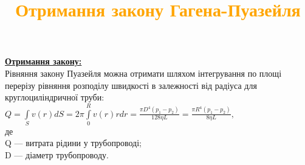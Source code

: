 \documentclass[aspectratio=169]{beamer}
\begin{document}
{
\title{\textcolor{orange}{Отримання закону Гагена-Пуазейля}}
\begin{frame}
\textbf{\underline{Отримання закону:}}\\
Рівняння закону Пуазейля можна отримати шляхом інтегрування по площі перерізу рівняння розподілу швидкості в залежності від радіуса для круглоциліндричної труби:
{
\center ${\displaystyle Q=\int \limits _{S}v\left(r\right)dS=2\pi \int \limits _{0}^{R}v\left(r\right)rdr={\frac {\pi D^{4}(p_{1}-p_{2})}{128\eta L}}={\frac {\pi R^{4}(p_{1}-p_{2})}{8\eta L}},}$\\
}
де\\
Q — витрата рідини у трубопроводі;\\
D — діаметр трубопроводу.
\end{frame}
}
\end{document}
